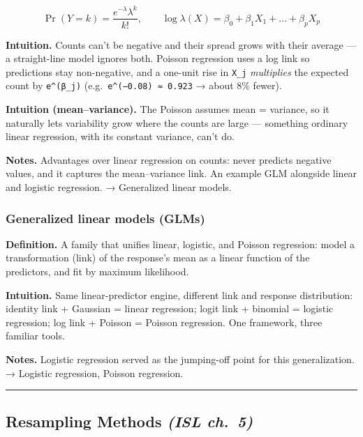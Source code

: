 \documentclass[
  10pt,
  letterpaper,
  onecolumn]{article}
\begin{document}
\begin{equation*}
\Pr(Y=k)=\frac{e^{-\lambda}\lambda^{k}}{k!},
\qquad
\log\lambda(X)=\beta_0+\beta_1X_1+\dots+\beta_pX_p
\end{equation*}

\textbf{Intuition.} Counts can't be negative and their spread grows with
their average --- a straight-line model ignores both. Poisson regression
uses a log link so predictions stay non-negative, and a one-unit rise in
\texttt{X\_j} \emph{multiplies} the expected count by
\texttt{e\^{}(β\_j)} (e.g.~\texttt{e\^{}(−0.08)\ ≈\ 0.923} → about 8\%
fewer).

\textbf{Intuition (mean--variance).} The Poisson assumes mean =
variance, so it naturally lets variability grow where the counts are
large --- something ordinary linear regression, with its constant
variance, can't do.

\textbf{Notes.} Advantages over linear regression on counts: never
predicts negative values, and it captures the mean--variance link. An
example GLM alongside linear and logistic regression. → Generalized
linear models.

\hypertarget{generalized-linear-models-glms}{%
\subsubsection{Generalized linear models
(GLMs)}\label{generalized-linear-models-glms}}

\textbf{Definition.} A family that unifies linear, logistic, and Poisson
regression: model a transformation (link) of the response's mean as a
linear function of the predictors, and fit by maximum likelihood.

\textbf{Intuition.} Same linear-predictor engine, different link and
response distribution: identity link + Gaussian = linear regression;
logit link + binomial = logistic regression; log link + Poisson =
Poisson regression. One framework, three familiar tools.

\textbf{Notes.} Logistic regression served as the jumping-off point for
this generalization. → Logistic regression, Poisson regression.

\begin{center}\rule{0.5\linewidth}{0.5pt}\end{center}

\hypertarget{resampling-methods-isl-ch.-5}{%
\subsection{\texorpdfstring{Resampling Methods \emph{(ISL
ch.~5)}}{Resampling Methods (ISL ch.~5)}}\label{resampling-methods-isl-ch.-5}}
\end{document}
